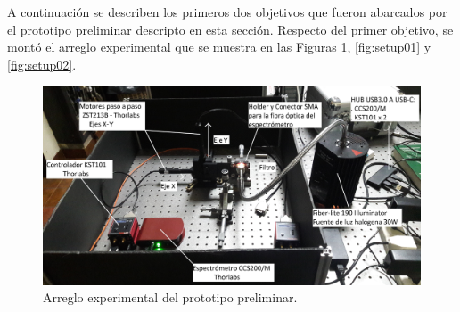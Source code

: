 A continuación se describen los primeros dos objetivos que fueron abarcados por el prototipo preliminar descripto en esta sección. Respecto del primer objetivo, se montó el arreglo experimental que se muestra en las Figuras \ref{fig:setup0}, \ref{fig:setup01} y \ref{fig:setup02}. 

\begin{figure}[H]
	\centering
	\includegraphics[width=1.0\textwidth]{Figs/microespectrometro/setupbarridooriginal.jpg}
	\caption{Arreglo experimental del prototipo preliminar.}
	\label{fig:setup0}
\end{figure}

